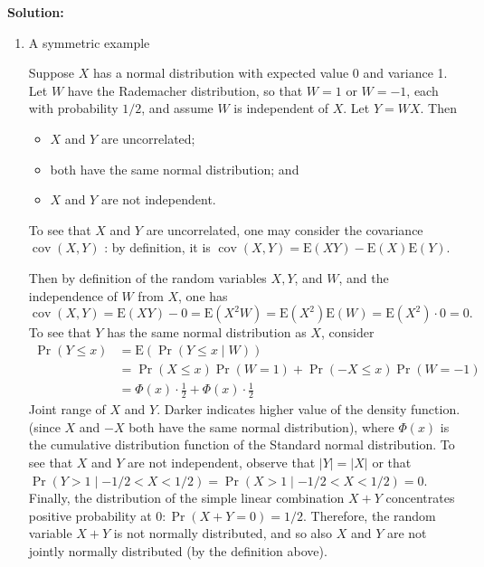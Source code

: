 \documentclass[13pt]{article}
\theoremstyle{definition}
\newenvironment{solution}
{\color{C2}\begin{framed}\begingroup\textbf{Solution:} }
  {\endgroup\end{framed}}
\theoremstyle{remark}
\begin{document}
\begin{solution}
\begin{enumerate}[label=(\alph*)]
        \item A symmetric example

Suppose $X$ has a normal distribution with expected value 0 and variance 1. Let $W$ have the Rademacher distribution, so that $W=1$ or $W=-1$, each with probability $1 / 2$, and assume $W$ is independent of $X$. Let $Y=W X$. Then
\begin{itemize}
    \item $X$ and $Y$ are uncorrelated;
    \item both have the same normal distribution; and
    \item $X$ and $Y$ are not independent.
\end{itemize}

To see that $X$ and $Y$ are uncorrelated, one may consider the covariance $\operatorname{cov}(X, Y)$ : by definition, it is $\operatorname{cov}(X, Y)=\mathrm{E}(X Y)-\mathrm{E}(X) \mathrm{E}(Y)$.

Then by definition of the random variables $X, Y$, and $W$, and the independence of $W$ from $X$, one has
$$
\operatorname{cov}(X, Y)=\mathrm{E}(X Y)-0=\mathrm{E}\left(X^2 W\right)=\mathrm{E}\left(X^2\right) \mathrm{E}(W)=\mathrm{E}\left(X^2\right) \cdot 0=0 .
$$
To see that $Y$ has the same normal distribution as $X$, consider
$$
\begin{aligned}
\operatorname{Pr}(Y \leq x) & =\mathrm{E}(\operatorname{Pr}(Y \leq x \mid W)) \\
& =\operatorname{Pr}(X \leq x) \operatorname{Pr}(W=1)+\operatorname{Pr}(-X \leq x) \operatorname{Pr}(W=-1) \\
& =\Phi(x) \cdot \frac{1}{2}+\Phi(x) \cdot \frac{1}{2}
\end{aligned}
$$
Joint range of $X$ and $Y$. Darker indicates higher value of the density function.
(since $X$ and $-X$ both have the same normal distribution), where $\Phi(x)$ is the cumulative distribution function of the Standard normal distribution.
To see that $X$ and $Y$ are not independent, observe that $|Y|=|X|$ or that $\operatorname{Pr}(Y>1 \mid-1 / 2<X<1 / 2)=\operatorname{Pr}(X>1 \mid-1 / 2<X<1 / 2)=0$.
Finally, the distribution of the simple linear combination $X+Y$ concentrates positive probability at $0: \operatorname{Pr}(X+Y=0)=1 / 2$. Therefore, the random variable $X+Y$ is not normally distributed, and so also $X$ and $Y$ are not jointly normally distributed (by the definition above).
    \end{enumerate}  
    
\end{solution}
\end{document}
